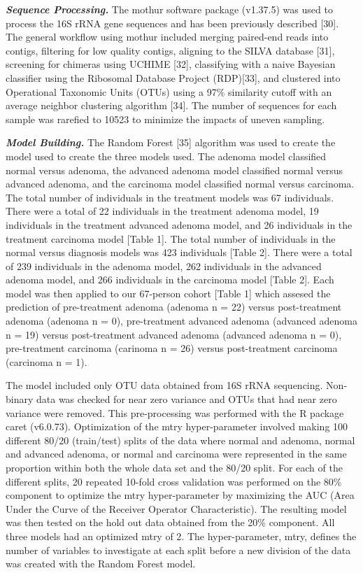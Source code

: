 \documentclass[12pt,]{article}
\begin{document}
\textbf{\emph{Sequence Processing.}} The mothur software package
(v1.37.5) was used to process the 16S rRNA gene sequences and has been
previously described {[}30{]}. The general workflow using mothur
included merging paired-end reads into contigs, filtering for low
quality contigs, aligning to the SILVA database {[}31{]}, screening for
chimeras using UCHIME {[}32{]}, classifying with a naive Bayesian
classifier using the Ribosomal Database Project (RDP){[}33{]}, and
clustered into Operational Taxonomic Units (OTUs) using a 97\%
similarity cutoff with an average neighbor clustering algorithm
{[}34{]}. The number of sequences for each sample was rarefied to 10523
to minimize the impacts of uneven sampling.

\textbf{\emph{Model Building.}} The Random Forest {[}35{]} algorithm was
used to create the model used to create the three models used. The
adenoma model classified normal versus adenoma, the advanced adenoma
model classified normal versus advanced adenoma, and the carcinoma model
classified normal versus carcinoma. The total number of individuals in
the treatment models was 67 individuals. There were a total of 22
individuals in the treatment adenoma model, 19 individuals in the
treatment advanced adenoma model, and 26 individuals in the treatment
carcinoma model {[}Table 1{]}. The total number of individuals in the
normal versus diagnosis models was 423 individuals {[}Table 2{]}. There
were a total of 239 individuals in the adenoma model, 262 individuals in
the advanced adenoma model, and 266 individuals in the carcinoma model
{[}Table 2{]}. Each model was then applied to our 67-person cohort
{[}Table 1{]} which assesed the prediction of pre-treatment adenoma
(adenoma n = 22) versus post-treatment adenoma (adenoma n = 0),
pre-treatment advanced adenoma (advanced adenoma n = 19) versus
post-treatment advanced adenoma (advanced adenoma n = 0), pre-treatment
carcinoma (carinoma n = 26) versus post-treatment carcinoma (carcinoma n
= 1).

The model included only OTU data obtained from 16S rRNA sequencing.
Non-binary data was checked for near zero variance and OTUs that had
near zero variance were removed. This pre-processing was performed with
the R package caret (v6.0.73). Optimization of the mtry hyper-parameter
involved making 100 different 80/20 (train/test) splits of the data
where normal and adenoma, normal and advanced adenoma, or normal and
carcinoma were represented in the same proportion within both the whole
data set and the 80/20 split. For each of the different splits, 20
repeated 10-fold cross validation was performed on the 80\% component to
optimize the mtry hyper-parameter by maximizing the AUC (Area Under the
Curve of the Receiver Operator Characteristic). The resulting model was
then tested on the hold out data obtained from the 20\% component. All
three models had an optimized mtry of 2. The hyper-parameter, mtry,
defines the number of variables to investigate at each split before a
new division of the data was created with the Random Forest model.
\end{document}
